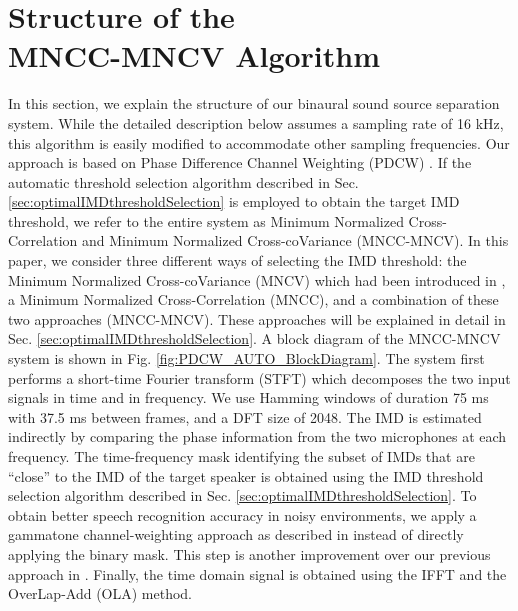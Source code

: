 \documentclass{article}
\begin{document}
\section{Structure of the\\MNCC-MNCV Algorithm}
	\label{Sec:OverviewPDCWAUTO}
In this section, we explain the structure of our binaural sound source separation system. While the detailed
description below assumes a sampling rate of 16 kHz, this algorithm is easily modified to accommodate other sampling frequencies. Our approach is based on Phase Difference Channel Weighting (PDCW) \cite{C_Kim_INTERSPEECH_2009_1}. If the automatic threshold selection algorithm  described in Sec. \ref{sec:optimalIMDthresholdSelection}  is employed to obtain the target IMD threshold,  we refer to the entire system as Minimum Normalized
Cross-Correlation and Minimum Normalized Cross-coVariance (MNCC-MNCV). In this paper, we consider three different ways of selecting the IMD threshold: the  Minimum Normalized Cross-coVariance (MNCV)  which had been introduced in \cite{C_Kim_INTERSPEECH_2010_1}, a
Minimum Normalized Cross-Correlation (MNCC), and a combination of these two approaches (MNCC-MNCV). These approaches will be explained in   detail in Sec. \ref{sec:optimalIMDthresholdSelection}.
A block diagram of the MNCC-MNCV system is shown in Fig.  \ref{fig:PDCW_AUTO_BlockDiagram}.  The system first  performs a short-time Fourier transform (STFT) which decomposes the two input signals in time and in frequency. We use Hamming windows of duration 75 ms with 37.5 ms between frames, and a DFT size of 2048.  The  IMD is estimated indirectly by comparing the phase information from the two microphones at each frequency. The time-frequency mask identifying the subset of IMDs that are ``close'' to the IMD of the target speaker is obtained
using the IMD threshold selection algorithm described in Sec. \ref{sec:optimalIMDthresholdSelection}.   To obtain better speech recognition accuracy in noisy environments, we apply a gammatone channel-weighting approach as described in \cite{C_Kim_INTERSPEECH_2009_1}
instead of directly applying the binary mask. This step is another improvement
over our previous approach in \cite{C_Kim_INTERSPEECH_2010_1}. Finally, the
time domain signal is obtained using the IFFT and the OverLap-Add (OLA) method.  
%
\end{document}
